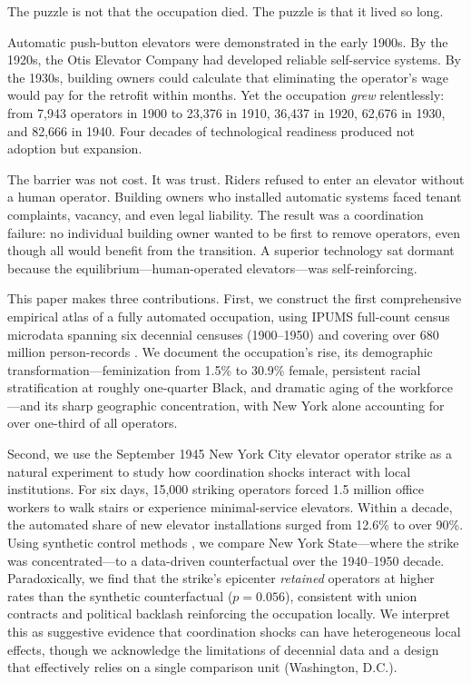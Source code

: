\documentclass[12pt]{article}
\begin{document}
The puzzle is not that the occupation died. The puzzle is that it lived so long.

Automatic push-button elevators were demonstrated in the early 1900s. By the 1920s, the Otis Elevator Company had developed reliable self-service systems. By the 1930s, building owners could calculate that eliminating the operator's wage would pay for the retrofit within months. Yet the occupation \textit{grew} relentlessly: from 7,943 operators in 1900 to 23,376 in 1910, 36,437 in 1920, 62,676 in 1930, and 82,666 in 1940. Four decades of technological readiness produced not adoption but expansion.

The barrier was not cost. It was trust. Riders refused to enter an elevator without a human operator. Building owners who installed automatic systems faced tenant complaints, vacancy, and even legal liability. The result was a coordination failure: no individual building owner wanted to be first to remove operators, even though all would benefit from the transition. A superior technology sat dormant because the equilibrium---human-operated elevators---was self-reinforcing.

This paper makes three contributions. First, we construct the first comprehensive empirical atlas of a fully automated occupation, using IPUMS full-count census microdata spanning six decennial censuses (1900--1950) and covering over 680 million person-records \citep{ruggles2024}. We document the occupation's rise, its demographic transformation---feminization from 1.5\% to 30.9\% female, persistent racial stratification at roughly one-quarter Black, and dramatic aging of the workforce---and its sharp geographic concentration, with New York alone accounting for over one-third of all operators.

Second, we use the September 1945 New York City elevator operator strike as a natural experiment to study how coordination shocks interact with local institutions. For six days, 15,000 striking operators forced 1.5 million office workers to walk stairs or experience minimal-service elevators. Within a decade, the automated share of new elevator installations surged from 12.6\% to over 90\%. Using synthetic control methods \citep{abadie2010, abadie2015}, we compare New York State---where the strike was concentrated---to a data-driven counterfactual over the 1940--1950 decade. Paradoxically, we find that the strike's epicenter \textit{retained} operators at higher rates than the synthetic counterfactual ($p = 0.056$), consistent with union contracts and political backlash reinforcing the occupation locally. We interpret this as suggestive evidence that coordination shocks can have heterogeneous local effects, though we acknowledge the limitations of decennial data and a design that effectively relies on a single comparison unit (Washington, D.C.).
\end{document}
